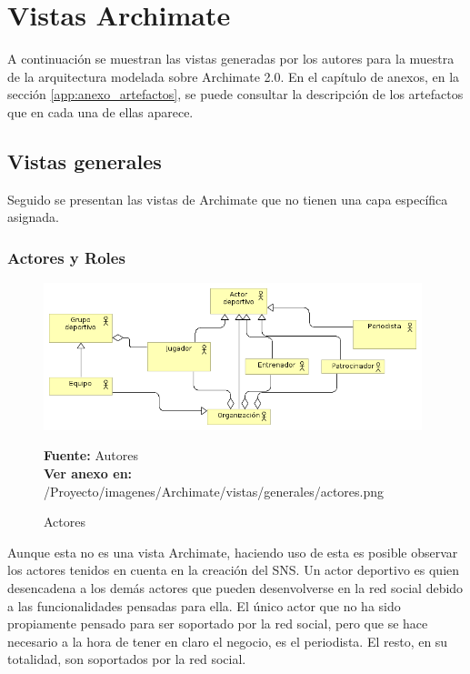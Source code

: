 \section{Vistas Archimate}

A continuación se muestran las vistas generadas por los autores para la muestra de la arquitectura modelada sobre Archimate 2.0. En el capítulo de anexos, en la sección \ref{app:anexo_artefactos}, se puede consultar la descripción de los artefactos que en cada una de ellas aparece.

\subsection{Vistas generales}

Seguido se presentan las vistas de Archimate que no tienen una capa específica asignada.

\subsubsection{Actores y Roles}

\begin{figure}[!htb]
  \begin{center}
    \includegraphics[width=11cm]{./imagenes/Archimate/vistas/generales/actores.png}
    \caption{Actores}
    \label{fig:Actores}
    \textbf{Fuente:}  Autores \\
    \textbf{Ver anexo en:} /Proyecto/imagenes/Archimate/vistas/generales/actores.png
  \end{center}
\end{figure}

Aunque esta no es una vista Archimate, haciendo uso de esta es posible observar los actores tenidos en cuenta en la creación del SNS. Un actor deportivo es quien desencadena a los demás actores que pueden desenvolverse en la red social debido a las funcionalidades pensadas para ella. El único actor que no ha sido propiamente pensado para ser soportado por la red social, pero que se hace necesario a la hora de tener en claro el negocio, es el periodista. El resto, en su totalidad, son soportados por la red social.

